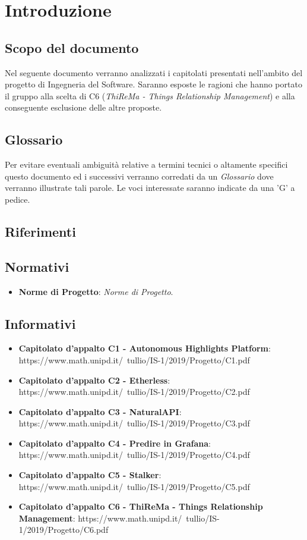 \section{Introduzione}
    \subsection{Scopo del documento}
        Nel seguente documento verranno analizzati i capitolati presentati nell'ambito del progetto di Ingegneria del Software. Saranno
        esposte le ragioni che hanno portato il gruppo alla scelta di C6 (\textit{ThiReMa - Things Relationship Management}) e
        alla conseguente esclusione delle altre proposte.
    \subsection{Glossario}
        Per evitare eventuali ambiguità relative a termini tecnici o altamente specifici questo documento ed i successivi verranno
        corredati da un \textit{Glossario} dove verranno illustrate tali parole. Le voci interessate saranno indicate da una 'G' a
        pedice.
    \subsection{Riferimenti}
        \subsection{Normativi}
            \begin{itemize}
                \item \textbf{Norme di Progetto}: \textit{Norme di Progetto}.
            \end{itemize}
        \subsection{Informativi}
            \begin{itemize}
                \item \textbf{Capitolato d'appalto C1 - Autonomous Highlights Platform}: https://www.math.unipd.it/~tullio/IS-1/2019/Progetto/C1.pdf
                \item \textbf{Capitolato d'appalto C2 - Etherless}: https://www.math.unipd.it/~tullio/IS-1/2019/Progetto/C2.pdf
                \item \textbf{Capitolato d'appalto C3 - NaturalAPI}: https://www.math.unipd.it/~tullio/IS-1/2019/Progetto/C3.pdf
                \item \textbf{Capitolato d'appalto C4 - Predire in Grafana}: https://www.math.unipd.it/~tullio/IS-1/2019/Progetto/C4.pdf
                \item \textbf{Capitolato d'appalto C5 - Stalker}: https://www.math.unipd.it/~tullio/IS-1/2019/Progetto/C5.pdf
                \item \textbf{Capitolato d'appalto C6 - ThiReMa - Things Relationship Management}: https://www.math.unipd.it/~tullio/IS-1/2019/Progetto/C6.pdf
            \end{itemize}
